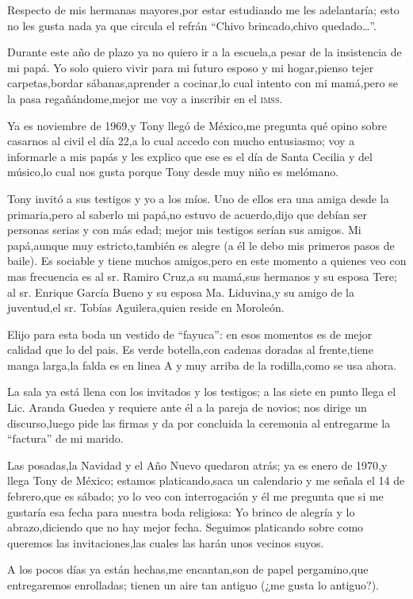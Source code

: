 \documentclass[letterpaper,12pt]{book}
\begin{document}
Respecto de mis hermanas mayores,por estar estudiando me les adelantaría; esto no les gusta nada ya que circula el refrán ``Chivo brincado,chivo quedado\ldots''.

Durante este año de plazo ya no quiero ir a la escuela,a pesar de la insistencia de mi papá. Yo solo quiero vivir para mi futuro esposo y mi hogar,pienso tejer carpetas,bordar sábanas,aprender a cocinar,lo cual intento con mi mamá,pero se la pasa regañándome,mejor me voy a inscribir en el \textsc{imss}.

Ya es noviembre de 1969,y Tony llegó de México,me pregunta qué opino sobre casarnos al civil el día 22,a lo cual accedo con mucho entusiasmo; voy a informarle a mis papás y les explico que ese es el día de Santa Cecilia y del músico,lo cual nos gusta porque Tony desde muy niño es melómano.

Tony invitó a sus testigos y yo a los míos. Uno de ellos era una amiga desde la primaria,pero al saberlo mi papá,no estuvo de acuerdo,dijo que debían ser personas serias y con más edad; mejor mis testigos serían sus amigos. Mi papá,aunque muy estricto,también es alegre (a él le debo mis primeros pasos de baile). Es sociable y tiene muchos amigos,pero en este momento a quienes veo con mas frecuencia es al sr. Ramiro Cruz,a su mamá,sus hermanos y su esposa Tere; al sr. Enrique García Bueno y su esposa Ma. Liduvina,y su amigo de la juventud,el sr. Tobías Aguilera,quien reside en Moroleón.

Elijo para esta boda un vestido de ``fayuca'': en esos momentos es de mejor calidad que lo del pais. Es verde botella,con cadenas doradas al frente,tiene manga larga,la falda es en linea A y muy arriba de la rodilla,como se usa ahora.

La sala ya está llena con los invitados y los testigos; a las siete en punto llega el Lic. Aranda Guedea y requiere ante él a la pareja de novios; nos dirige un discurso,luego pide las firmas y da por concluida la ceremonia al entregarme la ``factura'' de mi marido.

Las posadas,la Navidad y el Año Nuevo quedaron atrás; ya es enero de 1970,y llega Tony de México; estamos platicando,saca un calendario y me señala el 14 de febrero,que es sábado; yo lo veo con interrogación y él me pregunta que si me gustaría esa fecha para nuestra boda religiosa: Yo brinco de alegría y lo abrazo,diciendo que no hay mejor fecha. Seguimos platicando sobre como queremos las invitaciones,las cuales las harán unos vecinos suyos.

A los pocos días ya están hechas,me encantan,son de papel pergamino,que entregaremos enrolladas; tienen un aire tan antiguo (¿me gusta lo antiguo?).
\end{document}
